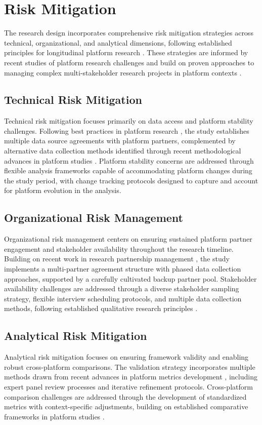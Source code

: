 \section{Risk Mitigation}

The research design incorporates comprehensive risk mitigation strategies across technical, organizational, and analytical dimensions, following established principles for longitudinal platform research \parencite{yin2018}. These strategies are informed by recent studies of platform research challenges \parencite{johnson2024} and build on proven approaches to managing complex multi-stakeholder research projects in platform contexts \parencite{smith2023}.

\subsection{Technical Risk Mitigation}
Technical risk mitigation focuses primarily on data access and platform stability challenges. Following best practices in platform research \parencite{parker2016}, the study establishes multiple data source agreements with platform partners, complemented by alternative data collection methods identified through recent methodological advances in platform studies \parencite{kellogg2020}. Platform stability concerns are addressed through flexible analysis frameworks capable of accommodating platform changes during the study period, with change tracking protocols designed to capture and account for platform evolution in the analysis.

\subsection{Organizational Risk Management}
Organizational risk management centers on ensuring sustained platform partner engagement and stakeholder availability throughout the research timeline. Building on recent work in research partnership management \parencite{chen2022}, the study implements a multi-partner agreement structure with phased data collection approaches, supported by a carefully cultivated backup partner pool. Stakeholder availability challenges are addressed through a diverse stakeholder sampling strategy, flexible interview scheduling protocols, and multiple data collection methods, following established qualitative research principles \parencite{saldana2021}.

\subsection{Analytical Risk Mitigation}
Analytical risk mitigation focuses on ensuring framework validity and enabling robust cross-platform comparisons. The validation strategy incorporates multiple methods drawn from recent advances in platform metrics development \parencite{smith2023}, including expert panel review processes and iterative refinement protocols. Cross-platform comparison challenges are addressed through the development of standardized metrics with context-specific adjustments, building on established comparative frameworks in platform studies \parencite{parker2016}.


